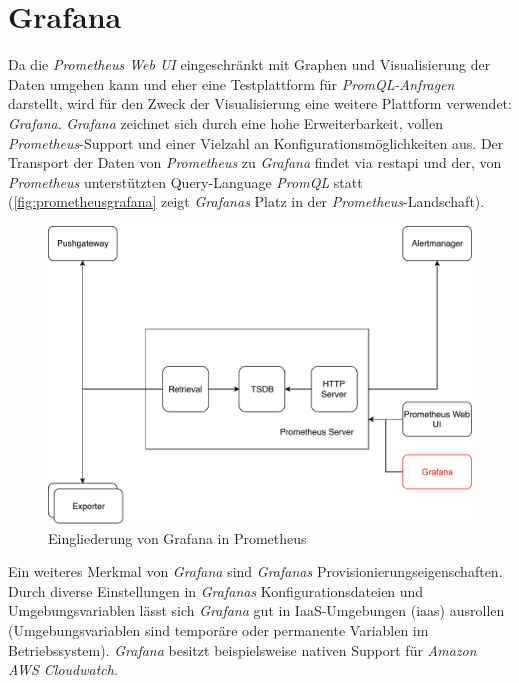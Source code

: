\documentclass[titlepage]{report}
\begin{document}
\section*{Grafana}
Da die \emph{Prometheus Web UI} eingeschränkt mit Graphen und
Visualisierung der Daten umgehen kann und eher eine Testplattform für
\emph{PromQL-Anfragen} darstellt, wird für den Zweck der
Visualisierung eine weitere Plattform verwendet:
\emph{Grafana}\cite{GRAFANA}. \emph{Grafana} zeichnet sich durch eine
hohe Erweiterbarkeit, vollen \emph{Prometheus}\hyp{}Support und einer
Vielzahl an Konfigurationsmöglichkeiten aus. Der Transport der Daten von
\emph{Prometheus} zu \emph{Grafana} findet via \gls{restapi} und der, von
\emph{Prometheus} unterstützten Query\hyp{}Language \emph{PromQL} statt
(\autoref{fig:prometheusgrafana} zeigt \emph{Grafanas} Platz in der
\emph{Prometheus}\hyp{}Landschaft).
\begin{figure}[H]
    \centering
    \includegraphics[width=1.0\textwidth]{figures/prometheus_grafana.pdf}
    \caption{Eingliederung von Grafana in Prometheus}\label{fig:prometheusgrafana}
\end{figure}
Ein weiteres Merkmal von \emph{Grafana} sind \emph{Grafanas}
Provisionierungseigenschaften. Durch diverse Einstellungen in
\emph{Grafanas} Konfigurationsdateien und Umgebungsvariablen lässt sich
\emph{Grafana} gut in IaaS\hyp{}Umgebungen (\gls{iaas})
ausrollen (Umgebungsvariablen sind temporäre oder permanente Variablen im
Betriebssystem)\cite[Beispiel zum Deployment von Grafana in Amazon
AWS]{GRAFANA_AWS_DEPLOYMENT}. \emph{Grafana} besitzt beispielsweise nativen
Support für \emph{Amazon AWS Cloudwatch}\cite{GRAFANA_CLOUDWATCH}.
\end{document}
